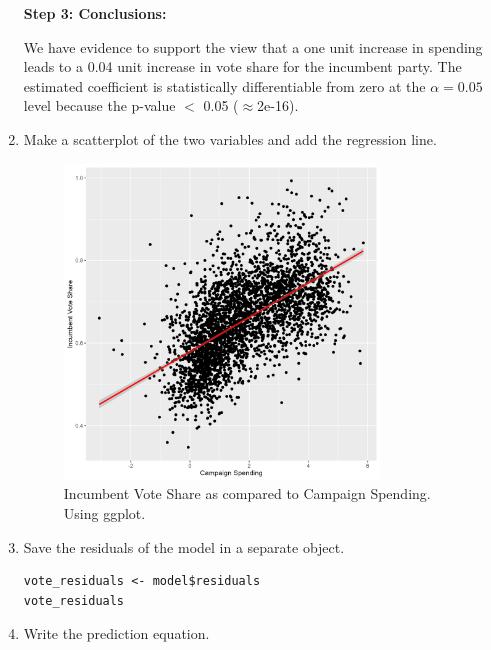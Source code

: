 \documentclass[12pt,letterpaper]{article}
\begin{document}
\begin{enumerate}
\begin{verbatim}
		\end{verbatim}
		
\textbf{Step 3: Conclusions:}
		
		We have evidence to support the view that a one unit increase in spending leads to a 0.04 unit increase in vote share for the incumbent party. The estimated coefficient is statistically differentiable from zero at the $\alpha=0.05$ level because the p-value $<$ 0.05 ($\approx $2e-16).
		

\newpage
		
		\item Make a scatterplot of the two variables and add the regression line. 	
		
		  
		
\begin{figure}[h!]
			
	\centering
	\caption{\footnotesize Incumbent Vote Share as compared to Campaign Spending. Using ggplot.}
	\includegraphics[width=0.79\textwidth]{vote_share_incumbent_scatter.png}
	
\end{figure}

		
		
		
		\item Save the residuals of the model in a separate object.	
		
			\begin{verbatim}
vote_residuals <- model$residuals
vote_residuals
		\end{verbatim}
		
		\item Write the prediction equation.
		
			\end{enumerate}		
			
\end{document}

